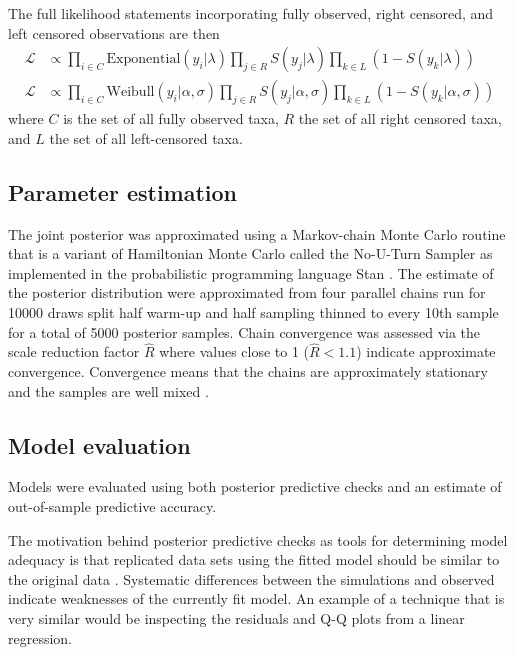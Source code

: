 \documentclass[12pt,letterpaper]{article}
\begin{document}
The full likelihood statements incorporating fully observed, right censored, and left censored observations are then
\begin{equation}
  \begin{aligned}
    \mathcal{L} &\propto \prod_{i \in C} \mathrm{Exponential}(y_{i} | \lambda) \prod_{j \in R} S(y_{j} | \lambda) \prod_{k \in L} \left(1 - S(y_{k} | \lambda)\right) \\
    \mathcal{L} &\propto \prod_{i \in C} \mathrm{Weibull}(y_{i} | \alpha, \sigma) \prod_{j \in R} S(y_{j} | \alpha, \sigma) \prod_{k \in L} \left(1 - S(y_{k} | \alpha, \sigma)\right)
  \end{aligned}
  \label{eq:censored_likelihood}
\end{equation}
where \(C\) is the set of all fully observed taxa, \(R\) the set of all right censored taxa, and \(L\) the set of all left-censored taxa.


\subsection{Parameter estimation}
The  joint posterior was approximated using a Markov-chain Monte Carlo routine that is a variant of Hamiltonian Monte Carlo called the No-U-Turn Sampler \citep{Hoffman2014} as implemented in the probabilistic programming language Stan \citep{stan-software:2014}. The estimate of the posterior distribution were approximated from four parallel chains run for 10000 draws split half warm-up and half sampling thinned to every 10th sample for a total of 5000 posterior samples. Chain convergence was assessed via the scale reduction factor \(\hat{R}\) where values close to 1 (\(\hat{R} < 1.1\)) indicate approximate convergence. Convergence means that the chains are approximately stationary and the samples are well mixed \citep{Gelman2013d}.


\subsection{Model evaluation}

Models were evaluated using both posterior predictive checks and an estimate of out-of-sample predictive accuracy. 

The motivation behind posterior predictive checks as tools for determining model adequacy is that replicated data sets using the fitted model should be similar to the original data \citep{Gelman2013d}. Systematic differences between the simulations and observed indicate weaknesses of the currently fit model. An example of a technique that is very similar would be inspecting the residuals and Q-Q plots from a linear regression.
\end{document}
